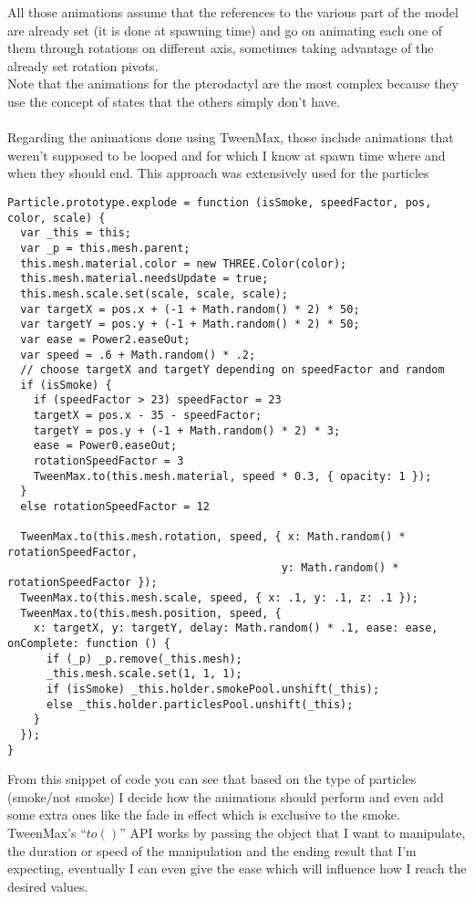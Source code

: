 \documentclass[a4paper,11pt]{article}
\begin{document}
All those animations assume that the references to the various part of the model are already set (it is done at spawning time) and go on animating each one of them through rotations on different axis, sometimes taking advantage of the already set rotation pivots.\\
Note that the animations for the pterodactyl are the most complex because they use the concept of states that the others simply don't have.\\\\
Regarding the animations done using TweenMax, those include animations that weren't supposed to be looped and for which I know at spawn time where and when they should end.
This approach was extensively used for the particles
\begin{verbatim}
Particle.prototype.explode = function (isSmoke, speedFactor, pos, color, scale) {
  var _this = this;
  var _p = this.mesh.parent;
  this.mesh.material.color = new THREE.Color(color);
  this.mesh.material.needsUpdate = true;
  this.mesh.scale.set(scale, scale, scale);
  var targetX = pos.x + (-1 + Math.random() * 2) * 50;
  var targetY = pos.y + (-1 + Math.random() * 2) * 50;
  var ease = Power2.easeOut;
  var speed = .6 + Math.random() * .2;
  // choose targetX and targetY depending on speedFactor and random
  if (isSmoke) {
    if (speedFactor > 23) speedFactor = 23
    targetX = pos.x - 35 - speedFactor;
    targetY = pos.y + (-1 + Math.random() * 2) * 3;
    ease = Power0.easeOut;
    rotationSpeedFactor = 3
    TweenMax.to(this.mesh.material, speed * 0.3, { opacity: 1 });
  }
  else rotationSpeedFactor = 12
  
  TweenMax.to(this.mesh.rotation, speed, { x: Math.random() * rotationSpeedFactor,
                                          y: Math.random() * rotationSpeedFactor });
  TweenMax.to(this.mesh.scale, speed, { x: .1, y: .1, z: .1 });
  TweenMax.to(this.mesh.position, speed, {
    x: targetX, y: targetY, delay: Math.random() * .1, ease: ease, onComplete: function () {
      if (_p) _p.remove(_this.mesh);
      _this.mesh.scale.set(1, 1, 1);
      if (isSmoke) _this.holder.smokePool.unshift(_this);
      else _this.holder.particlesPool.unshift(_this);
    }
  });
}
\end{verbatim}
From this snippet of code you can see that based on the type of particles (smoke/not smoke) I decide how the animations should perform and even add some extra ones like the fade in effect which is exclusive to the smoke.\\
TweenMax's ``$to()$'' API works by passing the object that I want to manipulate, the duration or speed of the manipulation and the ending result that I'm expecting, eventually I can even give the ease which will influence how I reach the desired values.\\
\end{document}
